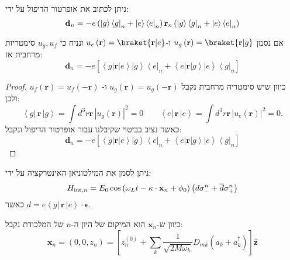 \documentclass{tstextbook}
\begin{document}
\begin{corollary}
ניתן לכתוב את אופרטור הדיפול על ידי:
$${\bf d}_{n}=-e\left(\left|g\right\rangle\left\langle g\right|_{n}+\left|e\right\rangle\left\langle e\right|_{n}\right){\bf r}_{n}\left(\left|g\right\rangle\left\langle g\right|_{n}+\left|e\right\rangle\left\langle e\right|_{n}\right)$$

\end{corollary}
\begin{proposition}
אם נסמן \(u_{g}\left( \mathbf{r} \right)=\braket{ \mathbf{r} | g }\) ו-\(u_{e}\left( \mathbf{r} \right)=\braket{ \mathbf{r} | e }\) ונניח כי \(u_{g},u_{f}\) סימטריות מרחבית אז:
$$\mathbf{d}_{n}=-e\left[\left\langle g\right|\mathbf{r}\left|e\right\rangle\left|g\right\rangle\left\langle e\right|_{n}+\left\langle e\right|\mathbf{r}\left|g\right\rangle\left|e\right\rangle\left\langle g\right|_{n}\right]$$

\end{proposition}
\begin{proof}
כיוון שיש סימטריה מרחבית נקבל \(u_{g}\left( \mathbf{r} \right)=u_{g}\left( \mathbf{-r} \right)\) ו- \(u_{f}\left( \mathbf{r} \right)=u_{f}\left( \mathbf{-r} \right)\) ולכן:
$$\left\langle  g|\,\mathbf{r}\,|g \right\rangle=\int d^{3}r\mathbf{r}\,|u_{g}\left(\mathbf{r}\right)|^{2}=0\qquad \left\langle  e|\,\mathbf{r}\,|e \right\rangle=\int d^{3}r\mathbf{r}\,|u_{e}\left(\mathbf{r}\right)|^{2}=0.$$
כאשר נציב בביטוי שקיבלנו עבור אופרטור הדיפול ונקבל:
$$\mathbf{d}_{n}=-e\left[\left\langle g\right|\mathbf{r}\left|e\right\rangle\left|g\right\rangle\left\langle e\right|_{n}+\left\langle e\right|\mathbf{r}\left|g\right\rangle\left|e\right\rangle\left\langle g\right|_{n}\right]$$

\end{proof}
\begin{proposition}
ניתן לסמן את המילטוניאן האינטרקציה על ידי:
$$H_{\mathrm{int},n}=E_{0}\cos\left(\omega_{L}t-\kappa\cdot{\bf x}_{n}+\phi_{0}\right)\left(d\sigma_{-}^{n}+\overline{{{d}}}\sigma_{+}^{n}\right)$$
כאשר \(d=e\left\langle g|\,\mathbf{r}\,|e\right\rangle\cdot{\hat{\boldsymbol{\epsilon}}}\).

\end{proposition}
\begin{corollary}
כיוון ש-\(\mathbf{x}_{n}\) הוא המיקום של היון ה-\(n\) של המלכודת נקבל:
$$\mathbf{x}_{n}=(0,0,z_{n})=\left[z_{n}^{(0)}+\sum_{k}{\frac{1}{\sqrt{2M\omega_{k}}}}D_{m k}\left(a_{k}+a_{k}^{\dagger}\right)\right]\hat{\mathbf{z}}$$

\end{corollary}
\end{document}

